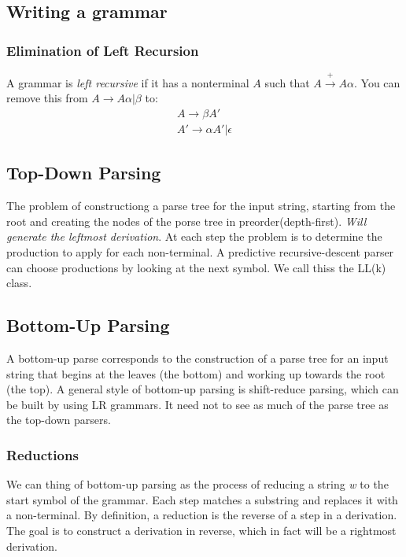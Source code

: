 \documentclass{article}
\newcommand{\toplus}{\stackrel{+}\rightarrow}
\begin{document}
\subsection{Writing a grammar} %
\label{sub:Writing a grammar}

\subsubsection{Elimination of Left Recursion} %
\label{ssub:Elimination of Left Recursion}
A grammar is \emph{left recursive} if it has a nonterminal $A$ such that $A \toplus A\alpha$. You can remove this from $A \to A\alpha | \beta$ to:
\begin{equation}
\begin{split}
	A \to \beta A' \\
	A' \to \alpha A' | \epsilon	
\end{split}
\end{equation}


\subsection{Top-Down Parsing} %
\label{sub:Top-Down Parsing}
The problem of constructiong a parse tree for the input string, starting from the root and creating the nodes of the porse tree in preorder(depth-first). \emph{Will generate the leftmost derivation}. At each step the problem is to determine the production to apply for each non-terminal. A predictive recursive-descent parser can choose productions by looking at the next symbol. We call thiss the LL(k) class.

\subsection{Bottom-Up Parsing} %
\label{sub:Bottom-Up Parsing}
A bottom-up parse corresponds to the construction of a parse tree for an input string that begins at the leaves (the bottom) and working up towards the root (the top). A general style of bottom-up parsing is shift-reduce parsing, which can be built by using LR grammars. It need not to see as much of the parse tree as the top-down parsers.
\subsubsection{Reductions} %
\label{ssub:Reductions}
We can thing of bottom-up parsing as the process of reducing a string \emph{w} to the start symbol of the grammar. Each step matches a substring and replaces it with a non-terminal. By definition, a reduction is the reverse of a step in a derivation. The goal is to construct a derivation in reverse, which in fact will be a rightmost derivation.
\end{document}
